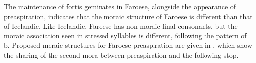 \documentclass[output=paper,colorlinks,citecolor=brown]{langscibook}
\begin{document}

The maintenance of fortis geminates in Faroese, alongside the appearance of preaspiration, indicates that the moraic structure of Faroese is different than that of Icelandic. Like Icelandic, Faroese has non-moraic final consonants, but the moraic association seen in stressed syllables is different, following the pattern of b. Proposed moraic structures for Faroese preaspiration are given in , which show the sharing of the second mora between preaspiration and the following stop.


\end{document}
